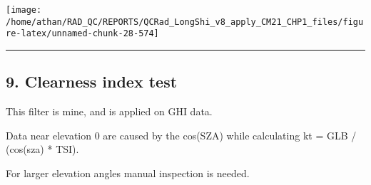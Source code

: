 \documentclass[
  10pt,
  a4paper,oneside]{article}
\begin{document}
\begin{center}\texttt{[image: /home/athan/RAD\_QC/REPORTS/QCRad\_LongShi\_v8\_apply\_CM21\_CHP1\_files/figure-latex/unnamed-chunk-28-574]} \end{center}

\begin{center}\rule{0.5\linewidth}{0.5pt}\end{center}

\newpage

\hypertarget{clearness-index-test}{%
\subsection{9. Clearness index test}\label{clearness-index-test}}

This filter is mine, and is applied on GHI data.

Data near elevation 0 are caused by the cos(SZA) while calculating
kt = GLB / (cos(sza) * TSI).

For larger elevation angles manual inspection is needed.
\end{document}
